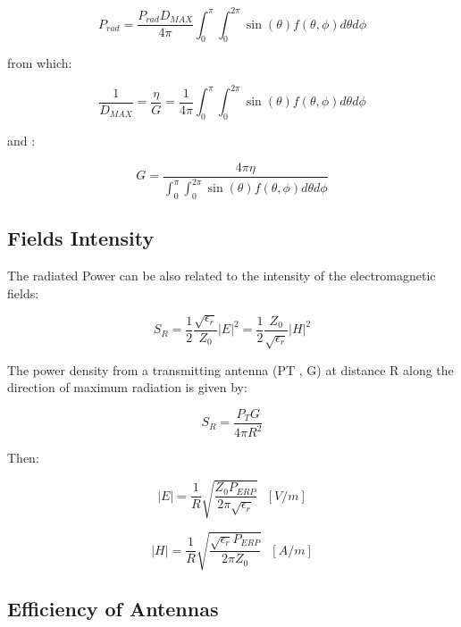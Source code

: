 \begin{equation}
	P_{rad} = \frac {P_{rad}D_{MAX}}{4 \pi}\int_0^{ \pi}\int_0^{2 \pi} \sin(\theta) f(\theta, \phi) d\theta d\phi
\end{equation}

from which:

\begin{equation}
	\frac{1}{D_{MAX}}=\frac{\eta}{G}= \frac{1}{4 \pi} \int_0^{\pi}\int_0^{2 \pi} \sin(\theta) f(\theta, \phi) d\theta d\phi
\end{equation}

and :

\begin{equation}
	G =\frac { 4\pi \eta}{\int_0^{ \pi}\int_0^{2 \pi} \sin(\theta) f(\theta, \phi) d\theta d\phi}
\end{equation}

\subsection{Fields Intensity} %
\label{sub:fields_intensity}

The radiated Power can be also related to the intensity of the electromagnetic fields:

\begin{equation}
	S_R=\frac{1}{2}\frac{\sqrt{\epsilon_r}}{Z_0}|E|^2= \frac{1}{2}\frac{Z_0}{\sqrt{\epsilon_r}}|H|^2
\end{equation}

The power density from a transmitting antenna (PT , G)
at distance R along the direction of maximum radiation
is given by: 

\begin{equation}	
S_R= \frac{P_TG}{4 \pi R^2}
\end{equation}


Then:

\begin{equation}
	|E| = \frac{1}{R} \sqrt{\frac{Z_0 P_{ERP}}{2\pi \sqrt{\epsilon_r}}} \ \ \ [V/m]
\end{equation}


\begin{equation}
	|H| = \frac{1}{R} \sqrt{\frac{\sqrt{\epsilon_r} P_{ERP}}{2\pi Z_0}} \ \ \ [A/m]
\end{equation}


\subsection{Efficiency of Antennas} %
\label{sub:efficienty_of_antennas}

